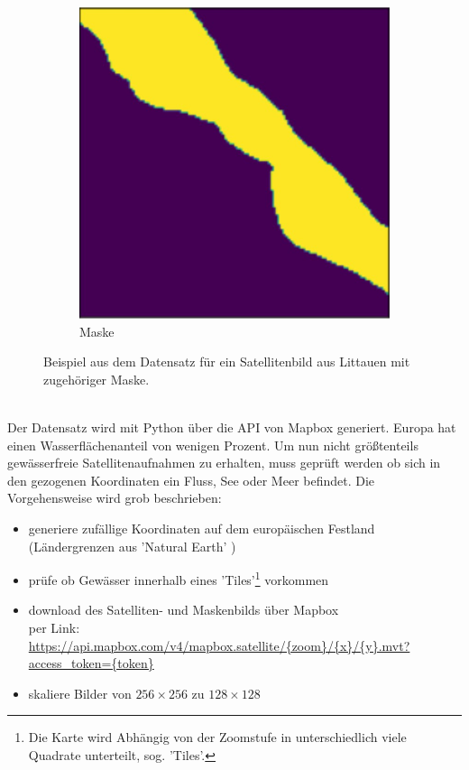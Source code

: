 \begin{figure}
\begin{subfigure}{0.48\textwidth}
        \includegraphics[width=\textwidth]{content/img/datensatz_mask.jpg}
        \caption{Maske}
    \end{subfigure}
    \caption{Beispiel aus dem Datensatz für ein Satellitenbild aus Littauen mit zugehöriger Maske.\cite{mapbox}}
    \label{fig:datensatz}
\end{figure}
\\
Der Datensatz wird mit Python über die API von Mapbox\cite{mapbox} generiert.
Europa hat einen Wasserflächenanteil von wenigen Prozent.
Um nun nicht größtenteils gewässerfreie Satellitenaufnahmen zu erhalten, muss geprüft werden ob sich in den gezogenen Koordinaten ein Fluss, See oder Meer befindet.
Die Vorgehensweise wird grob beschrieben:
\begin{itemize}
    \item generiere zufällige Koordinaten auf dem europäischen Festland (Ländergrenzen aus 'Natural Earth' \cite{naturalearth})
    \item prüfe ob Gewässer innerhalb eines 'Tiles'\footnote{\label{foot:tiles}Die Karte wird Abhängig von der Zoomstufe in unterschiedlich viele Quadrate unterteilt, sog. 'Tiles'.} vorkommen
    \item download des Satelliten- und Maskenbilds über Mapbox\cite{mapbox} \\
          per Link: \url{https://api.mapbox.com/v4/mapbox.satellite/{zoom}/{x}/{y}.mvt?access_token=\{token\}}
    \item skaliere Bilder von $256 \times 256$ zu $128 \times 128$
\end{itemize}